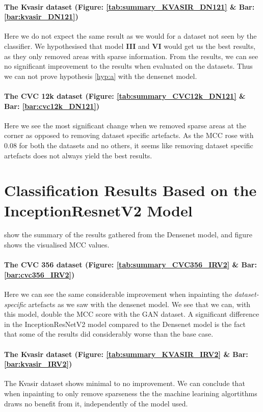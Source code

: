 \paragraph{The Kvasir dataset (Figure: \ref{tab:summary_KVASIR_DN121} \& Bar: \ref{bar:kvasir_DN121})}
Here we do not expect the same result as we would for a dataset not seen by the classifier. We hypothesised that model \textbf{III} and \textbf{VI} would get us the best results, as they only removed areas with sparse information. From the results, we can see no significant improvement to the results when evaluated on the datasets. Thus we can not prove hypothesis \ref{hyp:a} with the densenet model.

\paragraph{The CVC 12k dataset (Figure: \ref{tab:summary_CVC12k_DN121} \& Bar: \ref{bar:cvc12k_DN121})}
Here we see the most significant change when we removed sparse areas at the corner as opposed to removing dataset specific artefacts. As the MCC rose with 0.08 for both the datasets and no others, it seems like removing dataset specific artefacts does not always yield the best results.




\section{Classification Results Based on the InceptionResnetV2 Model}
 show the summary of the results gathered from the Densenet model, and figure  shows the visualised MCC values.


\paragraph{The CVC 356 dataset (Figure: \ref{tab:summary_CVC356_IRV2} \& Bar: \ref{bar:cvc356_IRV2})}
Here we can see the same considerable improvement when inpainting the \textit{dataset-specific} artefacts as we saw with the densenet model. We see that we can, with this model, double the MCC score with the GAN dataset.
A significant difference in the InceptionResNetV2 model compared to the Densenet model is the fact that some of the results did considerably worse than the base case. 

\paragraph{The Kvasir dataset (Figure: \ref{tab:summary_KVASIR_IRV2} \& Bar: \ref{bar:kvasir_IRV2})}
The Kvasir dataset shows minimal to no improvement. We can conclude that when inpainting to only remove sparseness the the machine learining algortithms draws no benefit from it, independently of the model used.

